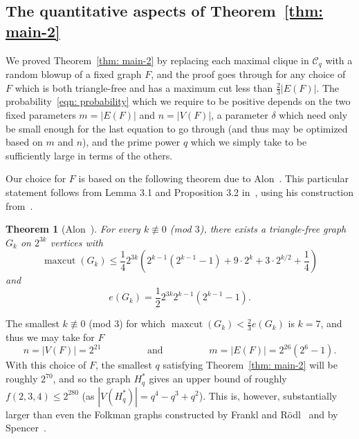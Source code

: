 \documentclass[A4paper,reqno,oneside,12pt]{amsart}
\theoremstyle{plain}
\newtheorem{theorem}{Theorem}[section]
\theoremstyle{definition}
\newcommand{\scC}{\mathscr{C}}
\def\d{\delta}
\newcommand{\maxcut}{\operatorname{maxcut}}
\begin{document}
\subsection{The quantitative aspects of Theorem~\ref{thm: main-2}}
\label{section: quantitative-aspects}

We proved Theorem~\ref{thm: main-2} by replacing each maximal clique in $\scC_q$ with a random blowup of a fixed graph $F$, and the proof goes through for any choice of $F$ which is both triangle-free and has a maximum cut less than $\frac{2}{3}|E(F)|$.
The probability~\eqref{eqn: probability} which we require to be positive depends on the two fixed parameters $m = |E(F)|$ and $n = |V(F)|$, a parameter $\d$ which need only be small enough for the last equation to go through (and thus may be optimized based on $m$ and $n$), and the prime power $q$ which we simply take to be sufficiently large in terms of the others.

Our choice for $F$ is based on the following theorem due to Alon~\cite{A94, A96}.
This particular statement follows from Lemma 3.1 and Proposition 3.2 in~\cite{A96}, using his construction from~\cite{A94}.

\begin{theorem}[Alon~\cite{A94, A96}]
\label{thm: Alon}
    For every $k \not\equiv 0$ (mod $3$), there exists a triangle-free graph $G_k$ on $2^{3k}$ vertices with
    \begin{equation}
    \label{eqn: alon-maxcut}
        \maxcut(G_k) \leq \frac{1}{4}2^{3k} \left( 2^{k-1}(2^{k-1}-1) + 9 \cdot 2^k + 3 \cdot 2^{k/2} + \frac{1}{4} \right)
    \end{equation}
    and
    \begin{equation}
    \label{eqn: alon-edges}
        e(G_k) = \frac{1}{2} 2^{3k} 2^{k-1}(2^{k-1}-1).
    \end{equation}
\end{theorem}

The smallest $k \not\equiv 0$ (mod 3) for which $\maxcut(G_k) < \frac{2}{3}e(G_k)$ is $k=7$, and thus we may take for $F$
\begin{equation*}
    n = |V(F)| = 2^{21} \hspace{2cm} \text{and} \hspace{2cm} m = |E(F)| = 2^{26}(2^6-1).
\end{equation*}
With this choice of $F$, the smallest $q$ satisfying Theorem~\ref{thm: main-2} will be roughly $2^{70}$, and so the graph $H_q^*$ gives an upper bound of roughly $f(2,3,4) \leq 2^{280}$ (as $|V(H_q^*)| = q^4-q^3+q^2$).
This is, however, substantially larger than even the Folkman graphs constructed by Frankl and R\"odl~\cite{FR86} and by Spencer~\cite{S88}.
\end{document}
